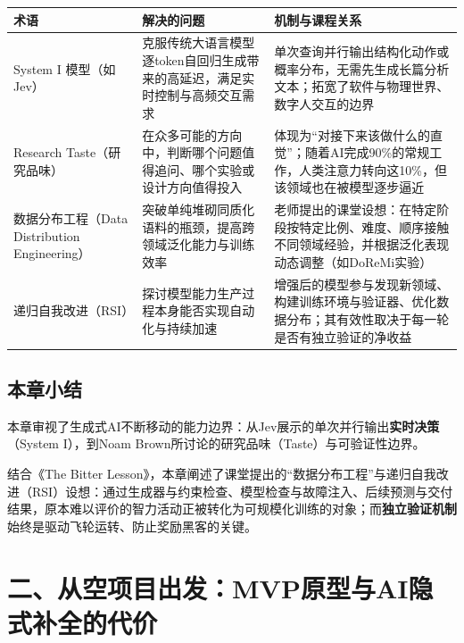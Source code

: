 \documentclass[UTF8,a4paper,11pt,fontset=fandol]{ctexart}
\begin{document}
\begin{center}\small\begin{tabularx}{\linewidth}{YYY}

\toprule

术语 & 解决的问题 & 机制与课程关系\\\midrule

System I 模型（如 Jev） & 克服传统大语言模型逐token自回归生成带来的高延迟，满足实时控制与高频交互需求 & 单次查询并行输出结构化动作或概率分布，无需先生成长篇分析文本；拓宽了软件与物理世界、数字人交互的边界\\[3pt]

Research Taste（研究品味） & 在众多可能的方向中，判断哪个问题值得追问、哪个实验或设计方向值得投入 & 体现为“对接下来该做什么的直觉”；随着AI完成90\%的常规工作，人类注意力转向这10\%，但该领域也在被模型逐步逼近\\[3pt]

数据分布工程（Data Distribution Engineering） & 突破单纯堆砌同质化语料的瓶颈，提高跨领域泛化能力与训练效率 & 老师提出的课堂设想：在特定阶段按特定比例、难度、顺序接触不同领域经验，并根据泛化表现动态调整（如DoReMi实验）\\[3pt]

递归自我改进（RSI） & 探讨模型能力生产过程本身能否实现自动化与持续加速 & 增强后的模型参与发现新领域、构建训练环境与验证器、优化数据分布；其有效性取决于每一轮是否有独立验证的净收益\\[3pt]

\bottomrule\end{tabularx}\end{center}

\subsection{本章小结}

本章审视了生成式AI不断移动的能力边界：从Jev展示的单次并行输出\textbf{实时决策}（System I），到Noam Brown所讨论的研究品味（Taste）与可验证性边界。

结合《The Bitter Lesson》，本章阐述了课堂提出的“数据分布工程”与递归自我改进（RSI）设想：通过生成器与约束检查、模型检查与故障注入、后续预测与交付结果，原本难以评价的智力活动正被转化为可规模化训练的对象；而\textbf{独立验证机制}始终是驱动飞轮运转、防止奖励黑客的关键。

\section{二、从空项目出发：MVP原型与AI隐式补全的代价}
\end{document}
